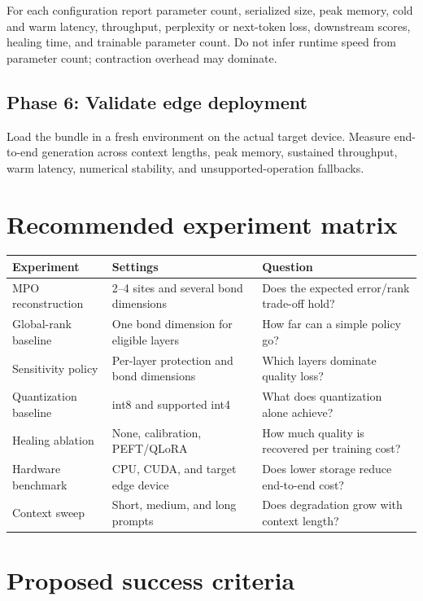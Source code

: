 \documentclass[11pt,a4paper]{article}
\begin{document}
For each configuration report parameter count, serialized size, peak memory,
cold and warm latency, throughput, perplexity or next-token loss, downstream
scores, healing time, and trainable parameter count. Do not infer runtime
speed from parameter count; contraction overhead may dominate.

\subsection{Phase 6: Validate edge deployment}

Load the bundle in a fresh environment on the actual target device. Measure
end-to-end generation across context lengths, peak memory, sustained
throughput, warm latency, numerical stability, and unsupported-operation
fallbacks.

\section{Recommended experiment matrix}

\begin{longtable}{p{}p{}p{}}
\toprule
\textbf{Experiment} & \textbf{Settings} & \textbf{Question}\\
\midrule
MPO reconstruction & 2--4 sites and several bond dimensions &
Does the expected error/rank trade-off hold?\\
Global-rank baseline & One bond dimension for eligible layers &
How far can a simple policy go?\\
Sensitivity policy & Per-layer protection and bond dimensions &
Which layers dominate quality loss?\\
Quantization baseline & int8 and supported int4 &
What does quantization alone achieve?\\
Healing ablation & None, calibration, PEFT/QLoRA &
How much quality is recovered per training cost?\\
Hardware benchmark & CPU, CUDA, and target edge device &
Does lower storage reduce end-to-end cost?\\
Context sweep & Short, medium, and long prompts &
Does degradation grow with context length?\\
\bottomrule
\end{longtable}

\section{Proposed success criteria}
\end{document}
